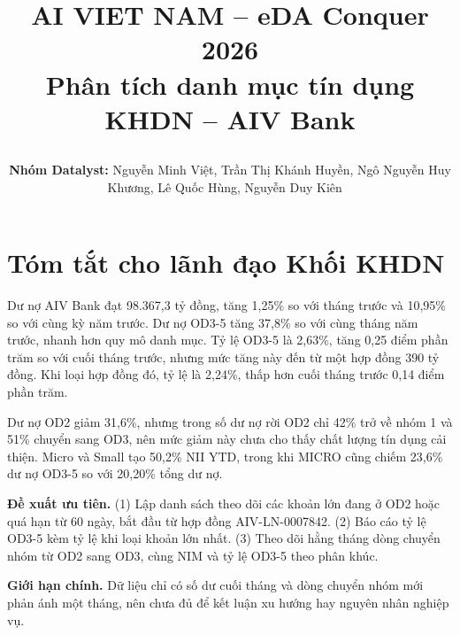 \documentclass[12pt]{eDA_conquer2026}
\title{%
  \begin{center}
        \Large {AI VIET NAM -- eDA Conquer 2026}\\[.5ex]
        \Huge \textbf{Phân tích danh mục tín dụng KHDN -- AIV Bank}\\[.5ex] %
  \end{center}
}
\author{
\begin{minipage}{\textwidth}
\centering
{
\vspace{-1.5em}
\textbf{Nhóm Datalyst:} Nguyễn Minh Việt, Trần Thị Khánh Huyền, Ngô Nguyễn Huy Khương, Lê Quốc Hùng, Nguyễn Duy Kiên
}\
\end{minipage}
}
\date{}
\begin{document}
\maketitle
\vspace{-3em}

\section*{Tóm tắt cho lãnh đạo Khối KHDN}

\begin{aivncodebox}
Dư nợ AIV Bank đạt 98.367,3 tỷ đồng, tăng 1,25\% so với tháng trước và 10,95\% so với cùng kỳ năm trước. Dư nợ OD3-5 tăng 37,8\% so với cùng tháng năm trước, nhanh hơn quy mô danh mục. Tỷ lệ OD3-5 là 2,63\%, tăng 0,25 điểm phần trăm so với cuối tháng trước, nhưng mức tăng này đến từ một hợp đồng 390 tỷ đồng. Khi loại hợp đồng đó, tỷ lệ là 2,24\%, thấp hơn cuối tháng trước 0,14 điểm phần trăm.
\smallskip

Dư nợ OD2 giảm 31,6\%, nhưng trong số dư nợ rời OD2 chỉ 42\% trở về nhóm 1 và 51\% chuyển sang OD3, nên mức giảm này chưa cho thấy chất lượng tín dụng cải thiện. Micro và Small tạo 50,2\% NII YTD, trong khi MICRO cũng chiếm 23,6\% dư nợ OD3-5 so với 20,20\% tổng dư nợ.
\smallskip

\textbf{Đề xuất ưu tiên.} (1) Lập danh sách theo dõi các khoản lớn đang ở OD2 hoặc quá hạn từ 60 ngày, bắt đầu từ hợp đồng AIV-LN-0007842. (2) Báo cáo tỷ lệ OD3-5 kèm tỷ lệ khi loại khoản lớn nhất. (3) Theo dõi hằng tháng dòng chuyển nhóm từ OD2 sang OD3, cùng NIM và tỷ lệ OD3-5 theo phân khúc.
\smallskip

\textbf{Giới hạn chính.} Dữ liệu chỉ có số dư cuối tháng và dòng chuyển nhóm mới phản ánh một tháng, nên chưa đủ để kết luận xu hướng hay nguyên nhân nghiệp vụ.
\end{aivncodebox}

\newpage
\setcounter{tocdepth}{1}
\tableofcontents
\thispagestyle{fancy}
\vspace{0.6cm}

\newpage
\end{document}
